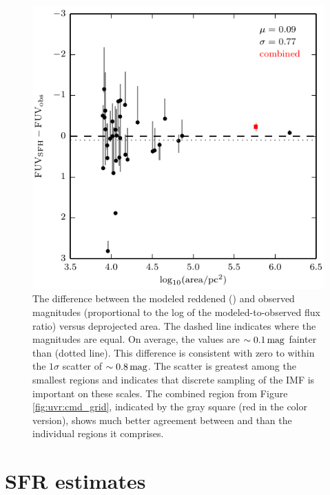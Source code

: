 \begin{figure}
\centering
\includegraphics[scale=1]{uv_regions-figures/fuv.pdf}
\caption[The difference between the modeled reddened and
    observed \fuv{} magnitudes
    versus
    deprojected area.]{The difference between the modeled reddened (\fuvsfh{}) and
    observed \citep[\fuvobs{},][]{Kang:2009} \fuv{} magnitudes
    (proportional to the log of the modeled-to-observed flux ratio) versus
    deprojected area. The dashed line indicates where the magnitudes are equal.
    On average, the \fuvsfh{} values are $\sim 0.1\,\mathrm{mag}$
    fainter than \fuvobs{} (dotted line). This difference is
    consistent with zero to within the $1\sigma$ scatter of $\sim
    0.8\,\mathrm{mag}$. The scatter is greatest among the smallest regions and
    indicates that discrete sampling of the IMF is important on these scales.
    The combined region from Figure \ref{fig:uvr:cmd_grid}, indicated by the gray
    square (red in the color version), shows much better agreement between
    \fuvsfh{} and \fuvobs{} than the individual regions
    it comprises.
}
\label{fig:uvr:fluxmod}
\end{figure}





\section{SFR estimates}\label{uvr:sfrs}

